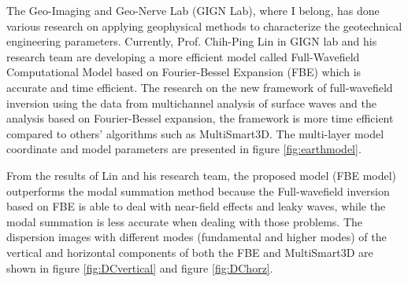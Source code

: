 The Geo-Imaging and Geo-Nerve Lab (GIGN Lab), where I belong, has done various research on applying geophysical methods to characterize the geotechnical engineering parameters. Currently, Prof. Chih-Ping Lin in GIGN lab and his research team are developing a more efficient model called Full-Wavefield Computational Model based on Fourier-Bessel Expansion (FBE) which is accurate and time efficient. The research on the new framework of full-wavefield inversion using the data from multichannel analysis of surface waves and the analysis based on Fourier-Bessel expansion, the framework is more time efficient compared to others’ algorithms such as MultiSmart3D. The multi-layer model coordinate and model parameters are presented in figure \ref{fig:earthmodel}.

From the results of Lin and his research team, the proposed model (FBE model) outperforms the modal summation method because the Full-wavefield inversion based on FBE is able to deal with near-field effects and leaky waves, while the modal summation is less accurate when dealing with those problems.   
The dispersion images with different modes (fundamental and higher modes) of the vertical and horizontal components of both the FBE and MultiSmart3D are shown in figure \ref{fig:DCvertical} and figure \ref{fig:DChorz}.           

